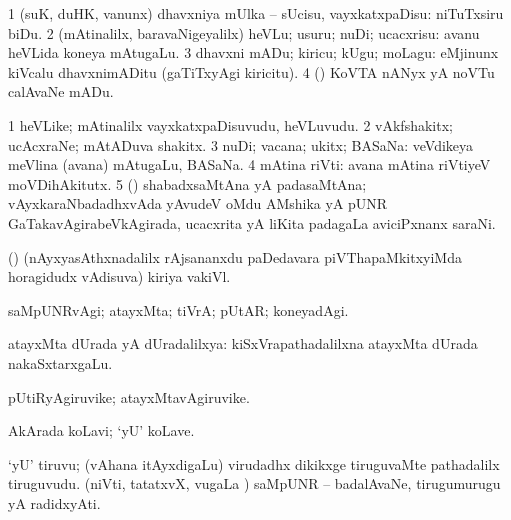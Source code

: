 {{{\bentry
{} 
\gl{\sakirx}
\expl{}
\bmng
\bnum
\num{1} (suK, duHK, \mo vanunx) dhavxniya mUlka -- sUcisu, vayxkatxpaDisu:  niTuTxsiru biDu. 
\num{2} (mAtinalilx, baravaNigeyalilx) heVLu; usuru; nuDi; ucacxrisu:  avanu heVLida koneya mAtugaLu. 
\num{3} dhavxni mADu; kiricu; kUgu; moLagu:  eMjinunx kiVcalu dhavxnimADitu (gaTiTxyAgi kiricitu). 
\num{4} (\nAyxshA) KoVTA nANyx yA noVTu calAvaNe mADu. 
\enum
\emng
\eentry

\bentry
{} 
\gl{\nA}
\bmng
\bnum
\num{1} heVLike; mAtinalilx vayxkatxpaDisuvudu, heVLuvudu. 
\num{2} vAkfshakitx; ucAcxraNe; mAtADuva shakitx. 
\num{3} nuDi; vacana; ukitx; BASaNa:  veVdikeya meVlina (avana) mAtugaLu, BASaNa. 
\num{4} mAtina riVti:  avana mAtina riVtiyeV moVDihAkitutx. 
\num{5} (\BAshA) shabadxsaMtAna yA padasaMtAna; vAyxkaraNbadadhxvAda yAvudeV oMdu AMshika yA pUNR GaTakavAgirabeVkAgirada, ucacxrita yA liKita padagaLa aviciPxnanx saraNi. 
\enum
\emng
\eentry

\bentry
{}
\gl{\nA}
\expl{}
\bmng
(\birx) (nAyxyasAthxnadalilx rAjsananxdu paDedavara piVThapaMkitxyiMda horagidudx vAdisuva) kiriya vakiVl. 
\emng
\eentry

\bentry
{} 
\gl{\kirxvi}
\expl{}
\bmng
saMpUNRvAgi; atayxMta; tiVrA; pUtAR; koneyadAgi. 
\emng
\eentry

\bentry
{} 
\gl{\gu}
\expl{}
\bmng
atayxMta dUrada yA dUradalilxya:  kiSxVrapathadalilxna atayxMta dUrada nakaSxtarxgaLu. 
\emng
\eentry

\bentry
{} 
\gl{\nA}
\expl{}
\bmng
pUtiRyAgiruvike; atayxMtavAgiruvike. 
\emng
\eentry

\bentry
{} 
\gl{\nA}
\expl{}
\bmng
{} AkArada koLavi; `yU' koLave. 
\emng
\eentry

\bentry
{} 
\gl{\nA}
\expl{}
\bmng
\banum
{} `yU' tiruvu; (vAhana itAyxdigaLu) virudadhx dikikxge tiruguvaMte  pathadalilx tiruguvudu. 
 (niVti, tatatxvX, \mo vugaLa \vi) saMpUNR -- badalAvaNe, tirugumurugu yA radidxyAti. 
\eanum
\emng
\eentry

\bentry 
{}
\gl{\saMkiSx}
\expl{}
\bmng
{} 
\emng
\eentry

}}}
